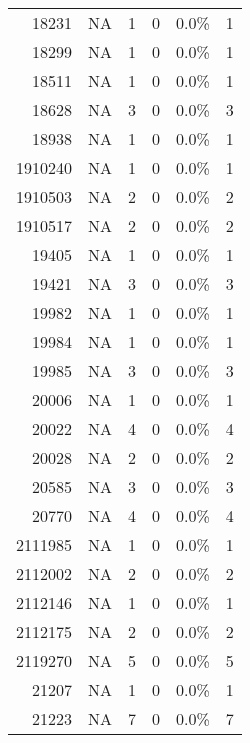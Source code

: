\begin{longtable}{lrrrrr}
	\multicolumn{1}{r}{18231} & NA    & 1     & 0     & 0.0\% & 1 \\
	\multicolumn{1}{r}{18299} & NA    & 1     & 0     & 0.0\% & 1 \\
	\multicolumn{1}{r}{18511} & NA    & 1     & 0     & 0.0\% & 1 \\
	\multicolumn{1}{r}{18628} & NA    & 3     & 0     & 0.0\% & 3 \\
	\multicolumn{1}{r}{18938} & NA    & 1     & 0     & 0.0\% & 1 \\
	\multicolumn{1}{r}{1910240} & NA    & 1     & 0     & 0.0\% & 1 \\
	\multicolumn{1}{r}{1910503} & NA    & 2     & 0     & 0.0\% & 2 \\
	\multicolumn{1}{r}{1910517} & NA    & 2     & 0     & 0.0\% & 2 \\
	\multicolumn{1}{r}{19405} & NA    & 1     & 0     & 0.0\% & 1 \\
	\multicolumn{1}{r}{19421} & NA    & 3     & 0     & 0.0\% & 3 \\
	\multicolumn{1}{r}{19982} & NA    & 1     & 0     & 0.0\% & 1 \\
	\multicolumn{1}{r}{19984} & NA    & 1     & 0     & 0.0\% & 1 \\
	\multicolumn{1}{r}{19985} & NA    & 3     & 0     & 0.0\% & 3 \\
	\multicolumn{1}{r}{20006} & NA    & 1     & 0     & 0.0\% & 1 \\
	\multicolumn{1}{r}{20022} & NA    & 4     & 0     & 0.0\% & 4 \\
	\multicolumn{1}{r}{20028} & NA    & 2     & 0     & 0.0\% & 2 \\
	\multicolumn{1}{r}{20585} & NA    & 3     & 0     & 0.0\% & 3 \\
	\multicolumn{1}{r}{20770} & NA    & 4     & 0     & 0.0\% & 4 \\
	\multicolumn{1}{r}{2111985} & NA    & 1     & 0     & 0.0\% & 1 \\
	\multicolumn{1}{r}{2112002} & NA    & 2     & 0     & 0.0\% & 2 \\
	\multicolumn{1}{r}{2112146} & NA    & 1     & 0     & 0.0\% & 1 \\
	\multicolumn{1}{r}{2112175} & NA    & 2     & 0     & 0.0\% & 2 \\
	\multicolumn{1}{r}{2119270} & NA    & 5     & 0     & 0.0\% & 5 \\
	\multicolumn{1}{r}{21207} & NA    & 1     & 0     & 0.0\% & 1 \\
	\multicolumn{1}{r}{21223} & NA    & 7     & 0     & 0.0\% & 7 \\

\end{longtable}
